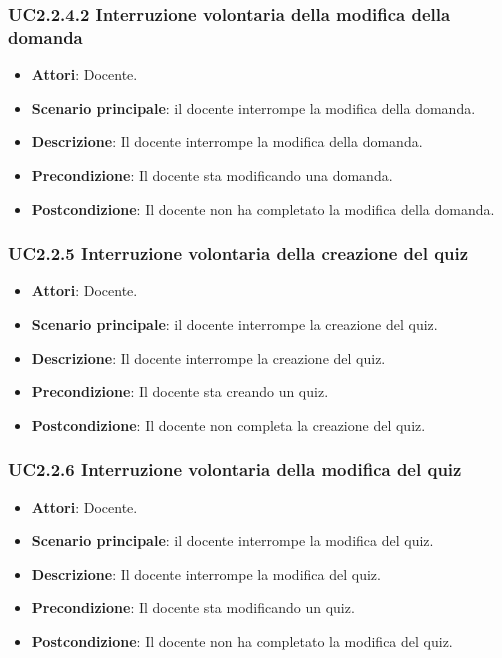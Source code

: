 \subsubsection{UC2.2.4.2 Interruzione volontaria della modifica della domanda}
\begin{itemize}
\item \textbf{Attori}: Docente.
\item \textbf{Scenario principale}: il docente interrompe la modifica della domanda.
\item \textbf{Descrizione}: Il docente interrompe la modifica della domanda.
\item \textbf{Precondizione}: Il docente sta modificando una domanda.
\item \textbf{Postcondizione}: Il docente non ha completato la modifica della domanda.
\end{itemize}
\subsubsection{UC2.2.5 Interruzione volontaria della creazione del quiz}
\begin{itemize}
\item \textbf{Attori}: Docente.
\item \textbf{Scenario principale}: il docente interrompe la creazione del quiz.
\item \textbf{Descrizione}: Il docente interrompe la creazione del quiz.
\item \textbf{Precondizione}: Il docente sta creando un quiz.
\item \textbf{Postcondizione}: Il docente non completa la creazione del quiz.
\end{itemize}
\subsubsection{UC2.2.6 Interruzione volontaria della modifica del quiz}
\begin{itemize}
\item \textbf{Attori}: Docente.
\item \textbf{Scenario principale}: il docente interrompe la modifica del quiz.
\item \textbf{Descrizione}: Il docente interrompe la modifica del quiz.
\item \textbf{Precondizione}: Il docente sta modificando un quiz.
\item \textbf{Postcondizione}: Il docente non ha completato la modifica del quiz.
\end{itemize}
